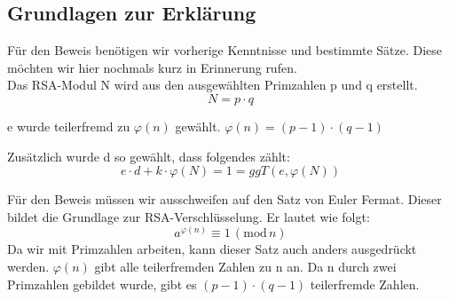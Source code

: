 \subsection{Grundlagen zur Erklärung}
Für den Beweis benötigen wir vorherige Kenntnisse und bestimmte Sätze. Diese möchten wir hier nochmals kurz in Erinnerung rufen.\\ 
Das RSA-Modul N wird aus den ausgewählten Primzahlen p und q erstellt.
\begin{equation*}
  N = p \cdot q
\end{equation*}

e wurde teilerfremd zu $ \varphi(n) $ gewählt. 
$ \varphi(n) = (p-1) \cdot (q-1) $

Zusätzlich wurde d so gewählt, dass folgendes zählt:
\begin{equation*}
 e \cdot d + k \cdot \varphi(N) = 1 = ggT(e,\varphi(N))
\end{equation*}

Für den Beweis müssen wir ausschweifen auf den Satz von Euler Fermat. Dieser bildet die Grundlage zur RSA-Verschlüsselung. Er lautet wie folgt:
\begin{equation*}
	a^{\varphi(n)} \equiv 1\,(\mathrm{mod}\,n)
\end{equation*}
Da wir mit Primzahlen arbeiten, kann dieser Satz auch anders ausgedrückt werden. $ \varphi(n) $ gibt alle teilerfremden Zahlen zu n an. Da n durch zwei Primzahlen gebildet wurde, gibt es $ (p-1) \cdot (q-1) $ teilerfremde Zahlen. 
%
